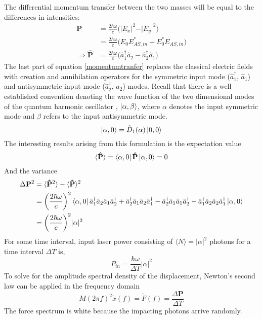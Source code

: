 		The differential momentum transfer between the two masses will be equal to the differences in intensities:
		\begin{equation}\label{momentumtranfer}
		\begin{aligned}
		 \mathbf{P} 	&= \frac{2 \hbar \omega}{c} \bigg( \vert E_x \vert^2 - \vert E_y \vert^2 \bigg) \\
						&= \frac{2 \hbar \omega}{c} \bigg( E_0 E^*_{AS,in} - E_0^*E_{AS,in} \bigg)\\
		\Rightarrow	\mathbf{\hat{P}}&= \frac{2 \hbar \omega}{c} \bigg( \hat{a}_1^{\dagger} \hat{a}_2 - \hat{a}_2^{\dagger} \hat{a}_1 \bigg)
		\end{aligned}
		\end{equation}
		The last part of equation \ref{momentumtranfer} replaces the classical electric fields with creation and annihilation operators for the symmetric input mode ($\hat{a}_1^{\dagger}$, $\hat{a}_1$) and antisymmetric input mode ($\hat{a}_2^{\dagger}$, $\hat{a}_2$) modes. Recall that there is a well established convention denoting the wave function of the two dimensional modes of the quantum harmonic oscillator \cite{GerryKnight}, $\ket{\alpha,\beta}$, where $\alpha$ denotes the input symmetric mode and $\beta$ refers to the input antisymmetric mode.
		\begin{equation}
		\ket{\alpha,0} = \hat{D}_1(\alpha) \ket{0,0}
		\end{equation}
		The interesting results arising from this formulation is the expectation value
		\begin{equation}
		\langle \mathbf{\hat{P}} \rangle = \bra{\alpha,0} \mathbf{\hat{P}}\ket{\alpha,0} = 0
		\end{equation}
		And the variance 
		\begin{equation} 
		\begin{aligned}
		\Delta \mathbf{P}^2 &= \langle \mathbf{\hat{P}}^2 \rangle  - \langle \mathbf{\hat{P}} \rangle^2 \\
							&= \bigg(\frac{2 \hbar \omega}{c}\bigg)^2 \bra{\alpha,0}  \hat{a}_1^{\dagger}  \hat{a}_2  \hat{a}_1  \hat{a}_2^{\dagger} + \hat{a}_2^{\dagger}  \hat{a}_1  \hat{a}_2  \hat{a}_1^{\dagger}
							- \hat{a}_2^{\dagger}  \hat{a}_1  \hat{a}_1  \hat{a}_2^{\dagger} - \hat{a}_1^{\dagger}  \hat{a}_2  \hat{a}_2  \hat{a}_1^{\dagger} \ket{\alpha,0}\\
							&= \bigg(\frac{2 \hbar \omega}{c}\bigg)^2 \vert \alpha \vert^2
		\end{aligned}
		\end{equation}
		For some time interval, input laser power consisting of $\langle N \rangle =\vert\alpha \vert^2$ photons for a time interval $\Delta T$ is,
		\begin{equation}
		P_{in} = \frac{\hbar \omega}{\Delta T} \vert \alpha \vert^2
		\end{equation}
		To solve for the amplitude spectral density of the displacement, Newton's second law can be applied in the frequency domain
		\begin{equation}
		M (2\pi f)^2 \tilde{x}(f) = \tilde{F}(f) = \frac{\Delta \mathbf{P}}{\Delta T}
		\end{equation}
		The force spectrum is white because the impacting photons arrive randomly.
		
